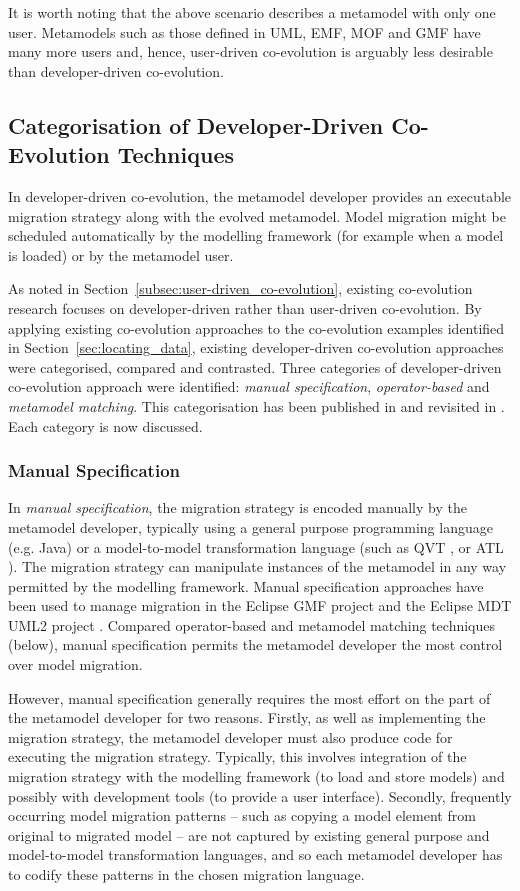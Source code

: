 It is worth noting that the above scenario describes a metamodel with only one user. Metamodels such as those defined in UML, EMF, MOF and GMF have many more users and, hence, user-driven co-evolution is arguably less desirable than developer-driven co-evolution. 


\subsection{Categorisation of Developer-Driven Co-Evolution Techniques}
\label{subsec:co-evolution_categorisation}
In developer-driven co-evolution, the metamodel developer provides an executable migration strategy along with the evolved metamodel. Model migration might be scheduled automatically by the modelling framework (for example when a model is loaded) or by the metamodel user.

As noted in Section~\ref{subsec:user-driven_co-evolution}, existing co-evolution research focuses on developer-driven rather than user-driven co-evolution. By applying existing co-evolution approaches to the co-evolution examples identified in Section~\ref{sec:locating_data}, existing developer-driven co-evolution approaches were categorised, compared and contrasted. Three categories of developer-driven co-evolution approach were identified: \emph{manual specification}, \emph{operator-based} and \emph{metamodel matching}. This categorisation has been published in \cite{rose09analysis} and revisited in \cite{rose10flock}. Each category is now discussed.

\subsubsection{Manual Specification}
In \emph{manual specification}, the migration strategy is encoded manually by the metamodel developer, typically using a general purpose programming language (e.g. Java) or a model-to-model transformation language (such as QVT \cite{qvt}, or ATL \cite{jouault05transforming}). The migration strategy can manipulate instances of the metamodel in any way permitted by the modelling framework. Manual specification approaches have been used to manage migration in the Eclipse GMF project \cite{gronback09emp} and the Eclipse MDT UML2 project \cite{mdt_uml2}. Compared operator-based and metamodel matching techniques (below), manual specification permits the metamodel developer the most control over model migration.

However, manual specification generally requires the most effort on the part of the metamodel developer for two reasons. Firstly, as well as implementing the migration strategy, the metamodel developer must also produce code for executing the migration strategy. Typically, this involves integration of the migration strategy with the modelling framework (to load and store models) and possibly with development tools (to provide a user interface). Secondly, frequently occurring model migration patterns -- such as copying a model element from original to migrated model -- are not captured by existing general purpose and model-to-model transformation languages, and so each metamodel developer has to codify these patterns in the chosen migration language.

